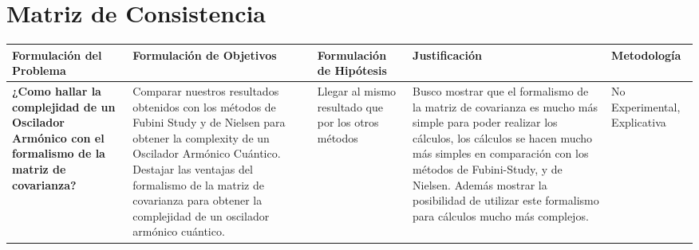 \documentclass[../Main.tex]{subfiles}
\begin{document}
\section{Matriz de Consistencia}

\begin{table}[!h]
\begin{center}
\begin{tabular}{| m{5em} | m{5em} | m{5em} | m{5em} | m{5em} |}
\hline
Formulación del Problema & Formulación de Objetivos & Formulación de Hipótesis & Justificación & Metodología \\
\hline \hline
\textbf{¿Como hallar la complejidad de un Oscilador Armónico con el formalismo de la matriz de covarianza?} & Comparar nuestros resultados obtenidos con los métodos de Fubini Study y de Nielsen para obtener la complexity de un Oscilador Armónico Cuántico. Destajar las ventajas del formalismo de la matriz de covarianza para obtener la complejidad de un oscilador armónico cuántico. & Llegar al mismo resultado que por los otros métodos & Busco mostrar que el formalismo de la matriz de covarianza es mucho más simple para poder realizar los cálculos, los cálculos se hacen mucho más simples en comparación con los métodos de Fubini-Study, y de Nielsen. Además mostrar la posibilidad de utilizar este formalismo para cálculos mucho más complejos. & No Experimental, Explicativa \\
\hline
\end{tabular}
\end{center}
\end{table}

\biblio %
\end{document}
